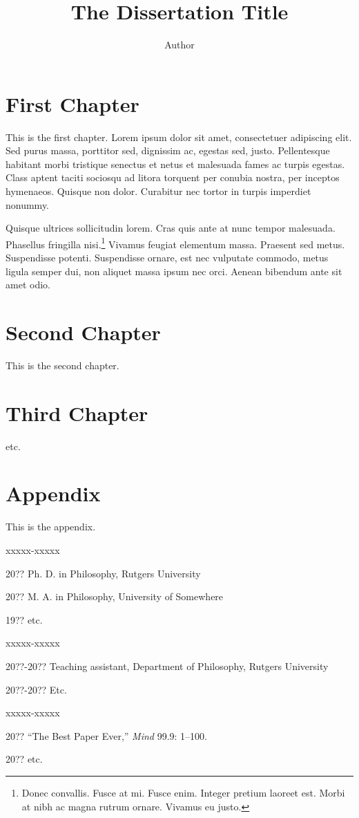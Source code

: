 \documentclass{rudiss}
\title{The Dissertation Title}
\author{Author}
\begin{document}
\beforepreface 
\afterpreface 

\chapter{First Chapter}
This is the first chapter. Lorem ipsum dolor sit amet, consectetuer adipiscing elit. Sed purus massa, porttitor sed, dignissim ac, egestas sed, justo. Pellentesque habitant morbi tristique senectus et netus et malesuada fames ac turpis egestas. Class aptent taciti sociosqu ad litora torquent per conubia nostra, per inceptos hymenaeos. Quisque non dolor. Curabitur nec tortor in turpis imperdiet nonummy. 

Quisque ultrices sollicitudin lorem. Cras quis ante at nunc tempor malesuada. Phasellus fringilla nisi.\footnote{Donec convallis. Fusce at mi. Fusce enim. Integer pretium laoreet est. Morbi at nibh ac magna rutrum ornare. Vivamus eu justo.} Vivamus feugiat elementum massa. Praesent sed metus. Suspendisse potenti. Suspendisse ornare, est nec vulputate commodo, metus ligula semper dui, non aliquet massa ipsum nec orci. Aenean bibendum ante sit amet odio.

\chapter{Second Chapter}
This is the second chapter.

\chapter{Third Chapter}
etc.

\appendix
\chapter{Appendix}
This is the appendix.

%

\begin{vita} 
\begin{descriptionlist}{xxxxx-xxxxx} %
\item[20??] Ph. D. in Philosophy, Rutgers University 
\item[20??] M. A. in Philosophy, University of Somewhere
\item[19??] etc.
\end{descriptionlist} 
\medskip 
\begin{descriptionlist}{xxxxx-xxxxx} %
\item[20??-20??] Teaching assistant, Department of Philosophy, Rutgers University 
\item[20??-20??] Etc.
\end{descriptionlist}
\medskip
\begin{descriptionlist}{xxxxx-xxxxx} %
\item[20??] ``The Best Paper Ever,'' \emph{Mind} 99.9: 1--100.
\item[20??] etc.
\end{descriptionlist}
\end{vita} 
\end{document}
